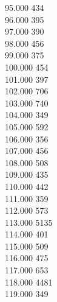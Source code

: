 { 95.000	434 \\
 96.000	395 \\
 97.000	390 \\
 98.000	456 \\
 99.000	375 \\
 100.000	454 \\
 101.000	397 \\
 102.000	706 \\
 103.000	740 \\
 104.000	349 \\
 105.000	592 \\
 106.000	356 \\
 107.000	456 \\
 108.000	508 \\
 109.000	435 \\
 110.000	442 \\
 111.000	359 \\
 112.000	573 \\
 113.000	5135 \\
 114.000	401 \\
 115.000	509 \\
 116.000	475 \\
 117.000	653 \\
 118.000	4481 \\
 119.000	349 \\
}
